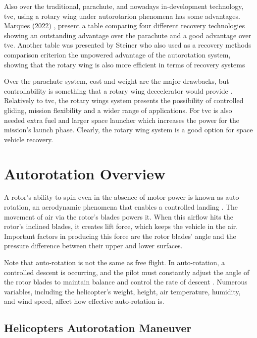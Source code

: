 Also over the traditional, parachute, and nowadays in-development technology, \gls{tvc}, using a rotary wing under autorotarion phenomena has some advantages. Marques (2022) \cite{marques_rocket_2022}, present a table comparing four different recovery technologies showing an outstanding advantage over the parachute and a good advantage over \gls{tvc}. Another table was presented by Steiner \cite{steiner_rotary_nodate} who also used as a recovery methods comparison criterion the unpowered advantage of the autorotation system, showing that the rotary wing is also more efficient in terms of recovery systems


Over the parachute system, cost and weight are the major drawbacks, but controllability is something that a rotary wing deccelerator would provide \cite{steiner_rotary_nodate}. Relatively to \gls{tvc}, the rotary wings system presents the possibility of controlled gliding, mission flexibility and a wider range of applications. For \gls{tvc} is also needed extra fuel and larger space launcher which increases the power for the mission's launch phase. Clearly, the rotary wing system is a good option for space vehicle recovery.

\section{Autorotation Overview}
\label{section:overview}

A rotor's ability to spin even in the absence of motor power is known as auto-rotation, an aerodynamic phenomena that enables a controlled landing \cite{steiner_rotary_nodate}. The movement of air via the rotor's blades powers it. When this airflow hits the rotor's inclined blades, it creates lift force, which keeps the vehicle in the air. Important factors in producing this force are the rotor blades' angle and the pressure difference between their upper and lower surfaces.

Note that auto-rotation is not the same as free flight. In auto-rotation, a controlled descent is occurring, and the pilot must constantly adjust the angle of the rotor blades to maintain balance and control the rate of descent \cite{federal_aviation_administration_helicopter_2021}. Numerous variables, including the helicopter's weight, height, air temperature, humidity, and wind speed, affect how effective auto-rotation is.


\subsection{Helicopters Autorotation Maneuver}

